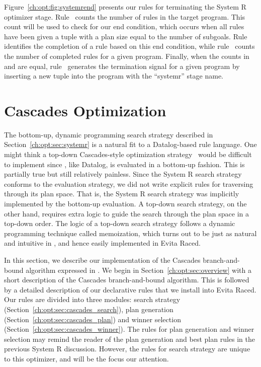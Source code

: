 Figure~\ref{ch:opt:fig:systemrend} presents our rules for terminating the
System R optimizer stage.  Rule~ counts the number of rules in the target
program.  This count will be used to check for our end condition, which occurs
when all rules have been given a  tuple with a plan size equal to
the number of subgoals.  Rule~ identifies the completion of a rule based
on this end condition, while rule~ counts the number of completed rules
for a given program.  Finally, when the counts in  and
 are equal, rule~ generates the termination signal for a given
program by inserting a new tuple into the  program with the ``systemr''
stage name.

\section{Cascades Optimization}
\label{ch:opt:sec:cascades}

The bottom-up, dynamic programming search strategy described in
Section~\ref{ch:opt:sec:systemr} is a natural fit to a Datalog-based rule
language.  One might think a top-down Cascades-style optimization
strategy~\cite{cascades} would be difficult to implement since \OVERLOG, like
Datalog, is evaluated in a bottom-up fashion.  This is partially true but still
relatively painless.  Since the System R search strategy conforms to the
\OVERLOG evaluation strategy, we did not write explicit rules for traversing
through its plan space.  That is, the System R search strategy was implicitly
implemented by the \OVERLOG bottom-up evaluation.  A top-down search strategy,
on the other hand, requires extra logic to guide the search through the plan
space in a top-down order.  The logic of a top-down search strategy follows a
dynamic programming technique called memoization, which turns out to be just as
natural and intuitive in \OVERLOG, and hence easily implemented in Evita Raced.

In this section, we describe our implementation of the Cascades
branch-and-bound algorithm expressed in \OVERLOG.  We begin in
Section~\ref{ch:opt:sec:overview} with a short description of the Cascades
branch-and-bound algorithm.  This is followed by a detailed description of our
declarative rules that we install into Evita Raced.  Our rules are divided
into three modules: search strategy
(Section~\ref{ch:opt:sec:cascades_search}), plan generation
(Section~\ref{ch:opt:sec:cascades_plan}) and winner selection
(Section~\ref{ch:opt:sec:cascades_winner}).  The rules for plan generation and
winner selection may remind the reader of the plan generation and best plan
rules in the previous System R discussion.  However, the rules for search strategy
are unique to this optimizer, and will be the focus our attention.

